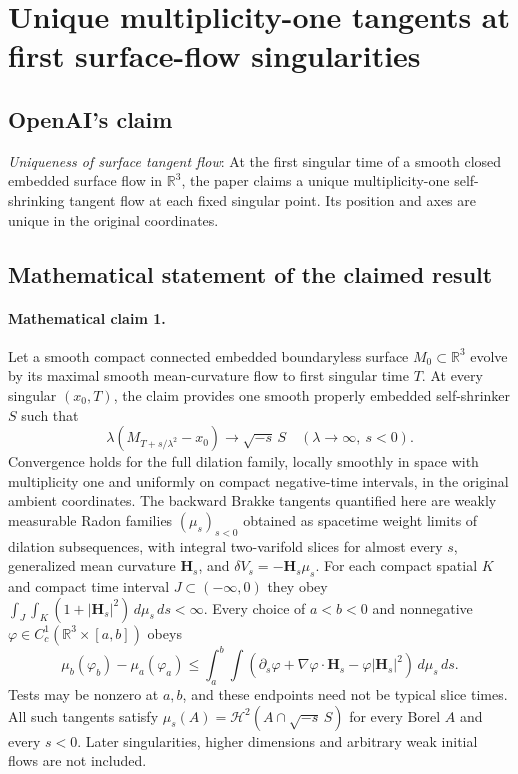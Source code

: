 \documentclass[11pt]{article}
\begin{document}
\section*{Unique multiplicity-one tangents at first surface-flow singularities}

\subsection{OpenAI's claim}
\textit{Uniqueness of surface tangent flow}: At the first singular time of a smooth closed embedded surface flow in $\mathbb R^3$, the paper claims a unique multiplicity-one self-shrinking tangent flow at each fixed singular point. Its position and axes are unique in the original coordinates.

\subsection{Mathematical statement of the claimed result}
\paragraph{Mathematical claim 1.} Let a smooth compact connected embedded boundaryless surface $M_0\subset\mathbb R^3$ evolve by its maximal smooth mean-curvature flow to first singular time $T$. At every singular $(x_0,T)$, the claim provides one smooth properly embedded self-shrinker $S$ such that \[\lambda(M_{T+s/\lambda^2}-x_0)\longrightarrow\sqrt{-s}\,S\quad(\lambda\to\infty,\ s<0).\] Convergence holds for the full dilation family, locally smoothly in space with multiplicity one and uniformly on compact negative-time intervals, in the original ambient coordinates. The backward Brakke tangents quantified here are weakly measurable Radon families $(\mu_s)_{s<0}$ obtained as spacetime weight limits of dilation subsequences, with integral two-varifold slices for almost every $s$, generalized mean curvature $\mathbf H_s$, and $\delta V_s=-\mathbf H_s\mu_s$. For each compact spatial $K$ and compact time interval $J\subset(-\infty,0)$ they obey $\int_J\int_K(1+|\mathbf H_s|^2)\,d\mu_s\,ds<\infty$. Every choice of $a<b<0$ and nonnegative $\varphi\in C_c^1(\mathbb R^3\times[a,b])$ obeys \[\mu_b(\varphi_b)-\mu_a(\varphi_a)\le\int_a^b\int(\partial_s\varphi+\nabla\varphi\cdot\mathbf H_s-\varphi|\mathbf H_s|^2)\,d\mu_s\,ds.\] Tests may be nonzero at $a,b$, and these endpoints need not be typical slice times. All such tangents satisfy $\mu_s(A)=\mathcal H^2(A\cap\sqrt{-s}\,S)$ for every Borel $A$ and every $s<0$. Later singularities, higher dimensions and arbitrary weak initial flows are not included.
\end{document}
